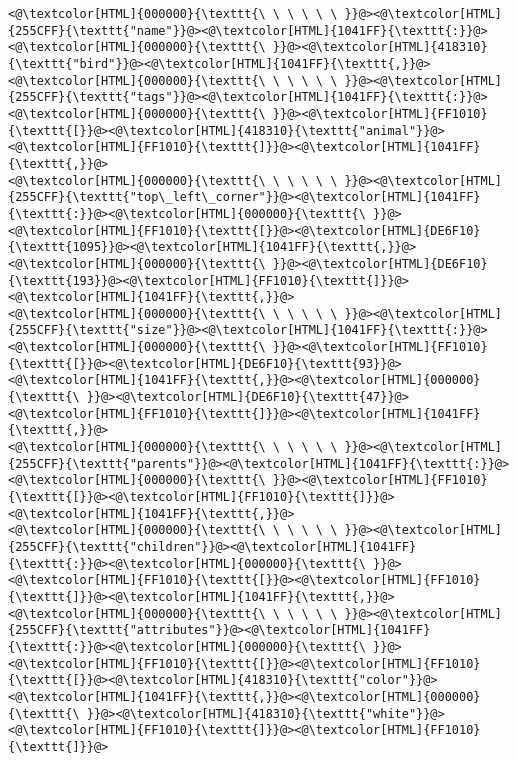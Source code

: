 \begin{lstlisting}
<@\textcolor[HTML]{000000}{\texttt{\ \ \ \ \ \ }}@><@\textcolor[HTML]{255CFF}{\texttt{"name"}}@><@\textcolor[HTML]{1041FF}{\texttt{:}}@><@\textcolor[HTML]{000000}{\texttt{\ }}@><@\textcolor[HTML]{418310}{\texttt{"bird"}}@><@\textcolor[HTML]{1041FF}{\texttt{,}}@>
<@\textcolor[HTML]{000000}{\texttt{\ \ \ \ \ \ }}@><@\textcolor[HTML]{255CFF}{\texttt{"tags"}}@><@\textcolor[HTML]{1041FF}{\texttt{:}}@><@\textcolor[HTML]{000000}{\texttt{\ }}@><@\textcolor[HTML]{FF1010}{\texttt{[}}@><@\textcolor[HTML]{418310}{\texttt{"animal"}}@><@\textcolor[HTML]{FF1010}{\texttt{]}}@><@\textcolor[HTML]{1041FF}{\texttt{,}}@>
<@\textcolor[HTML]{000000}{\texttt{\ \ \ \ \ \ }}@><@\textcolor[HTML]{255CFF}{\texttt{"top\_left\_corner"}}@><@\textcolor[HTML]{1041FF}{\texttt{:}}@><@\textcolor[HTML]{000000}{\texttt{\ }}@><@\textcolor[HTML]{FF1010}{\texttt{[}}@><@\textcolor[HTML]{DE6F10}{\texttt{1095}}@><@\textcolor[HTML]{1041FF}{\texttt{,}}@><@\textcolor[HTML]{000000}{\texttt{\ }}@><@\textcolor[HTML]{DE6F10}{\texttt{193}}@><@\textcolor[HTML]{FF1010}{\texttt{]}}@><@\textcolor[HTML]{1041FF}{\texttt{,}}@>
<@\textcolor[HTML]{000000}{\texttt{\ \ \ \ \ \ }}@><@\textcolor[HTML]{255CFF}{\texttt{"size"}}@><@\textcolor[HTML]{1041FF}{\texttt{:}}@><@\textcolor[HTML]{000000}{\texttt{\ }}@><@\textcolor[HTML]{FF1010}{\texttt{[}}@><@\textcolor[HTML]{DE6F10}{\texttt{93}}@><@\textcolor[HTML]{1041FF}{\texttt{,}}@><@\textcolor[HTML]{000000}{\texttt{\ }}@><@\textcolor[HTML]{DE6F10}{\texttt{47}}@><@\textcolor[HTML]{FF1010}{\texttt{]}}@><@\textcolor[HTML]{1041FF}{\texttt{,}}@>
<@\textcolor[HTML]{000000}{\texttt{\ \ \ \ \ \ }}@><@\textcolor[HTML]{255CFF}{\texttt{"parents"}}@><@\textcolor[HTML]{1041FF}{\texttt{:}}@><@\textcolor[HTML]{000000}{\texttt{\ }}@><@\textcolor[HTML]{FF1010}{\texttt{[}}@><@\textcolor[HTML]{FF1010}{\texttt{]}}@><@\textcolor[HTML]{1041FF}{\texttt{,}}@>
<@\textcolor[HTML]{000000}{\texttt{\ \ \ \ \ \ }}@><@\textcolor[HTML]{255CFF}{\texttt{"children"}}@><@\textcolor[HTML]{1041FF}{\texttt{:}}@><@\textcolor[HTML]{000000}{\texttt{\ }}@><@\textcolor[HTML]{FF1010}{\texttt{[}}@><@\textcolor[HTML]{FF1010}{\texttt{]}}@><@\textcolor[HTML]{1041FF}{\texttt{,}}@>
<@\textcolor[HTML]{000000}{\texttt{\ \ \ \ \ \ }}@><@\textcolor[HTML]{255CFF}{\texttt{"attributes"}}@><@\textcolor[HTML]{1041FF}{\texttt{:}}@><@\textcolor[HTML]{000000}{\texttt{\ }}@><@\textcolor[HTML]{FF1010}{\texttt{[}}@><@\textcolor[HTML]{FF1010}{\texttt{[}}@><@\textcolor[HTML]{418310}{\texttt{"color"}}@><@\textcolor[HTML]{1041FF}{\texttt{,}}@><@\textcolor[HTML]{000000}{\texttt{\ }}@><@\textcolor[HTML]{418310}{\texttt{"white"}}@><@\textcolor[HTML]{FF1010}{\texttt{]}}@><@\textcolor[HTML]{FF1010}{\texttt{]}}@>

\end{lstlisting}
